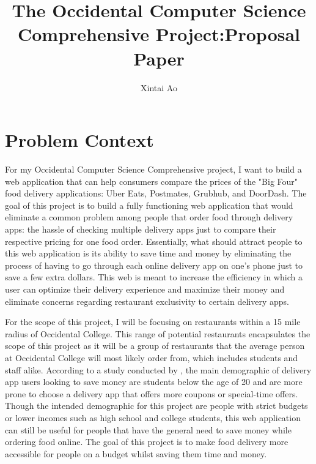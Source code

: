 \documentclass[10pt,twocolumn]{article}
\title{The Occidental Computer Science Comprehensive Project:\break Proposal Paper}
\author{Xintai Ao}
\affiliation{Occidental College}
\begin{document}
\maketitle
\section{Problem Context}

For my Occidental Computer Science Comprehensive project, I want to build a web application that can help consumers compare the prices of the "Big Four" food delivery applications: Uber Eats, Postmates, Grubhub, and DoorDash. The goal of this project is to build a fully functioning web application that would eliminate a common problem among people that order food through delivery apps: the hassle of checking multiple delivery apps just to compare their respective pricing for one food order. Essentially, what should attract people to this web application is its ability to save time and money by eliminating the process of having to go through each online delivery app on one's phone just to save a few extra dollars. This web is meant to increase the efficiency in which a user can optimize their delivery experience and maximize their money and eliminate concerns regarding restaurant exclusivity to certain delivery apps. 

For the scope of this project, I will be focusing on restaurants within a 15 mile radius of Occidental College. This range of potential restaurants encapsulates the scope of this project as it will be a group of restaurants that the average person at Occidental College will most likely order from, which includes students and staff alike. According to a study conducted by , the main demographic of delivery app users looking to save money are students below the age of 20 and are more prone to choose a delivery app that offers more coupons or special-time offers. Though the intended demographic for this project are people with strict budgets or lower incomes such as high school and college students, this web application can still be useful for people that have the general need to save money while ordering food online. The goal of this project is to make food delivery more accessible for people on a budget whilst saving them time and money. 
\end{document}
